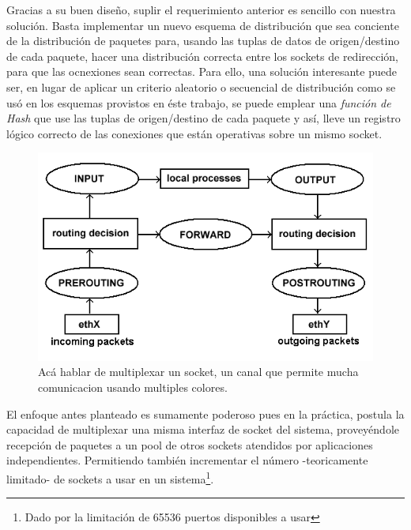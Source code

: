 Gracias a su buen diseño, suplir el requerimiento anterior es sencillo con nuestra solución. Basta implementar un nuevo esquema de distribución que sea conciente de la distribución de paquetes para, usando las tuplas de datos de origen/destino de cada paquete, hacer una distribución correcta entre los sockets de redirección, para que las ocnexiones sean correctas. Para ello, una solución interesante puede ser, en lugar de aplicar un criterio aleatorio o secuencial de distribución como se usó en los esquemas provistos en éste trabajo, se puede emplear una \emph{función de Hash} que use las tuplas de origen/destino de cada paquete y así, lleve un registro lógico correcto de las conexiones que están operativas sobre un mismo socket.

\begin{figure}[!h]
	\centering
	\includegraphics[scale=.2]{imagenes/netfilterArchitecture}
	\caption{Acá hablar de multiplexar un socket, un canal que permite mucha comunicacion usando multiples colores.}
	\label{netfilterArchitecture}
\end{figure}

El enfoque antes planteado es sumamente poderoso pues en la práctica, postula la capacidad de multiplexar una misma interfaz de socket del sistema, proveyéndole recepción de paquetes a un pool de otros sockets atendidos por aplicaciones independientes. Permitiendo también incrementar el número -teoricamente limitado- de sockets a usar en un sistema\footnote{Dado por la limitación de 65536 puertos disponibles a usar}.